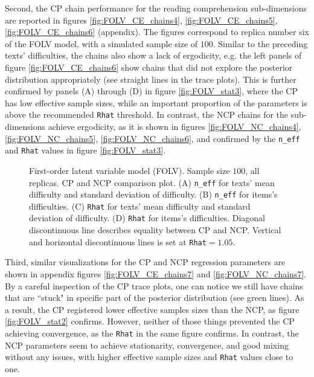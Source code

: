 Second, the CP chain performance for the reading comprehension sub-dimensions are reported in figures \ref{fig:FOLV_CE_chains4}, \ref{fig:FOLV_CE_chains5}, \ref{fig:FOLV_CE_chains6} (appendix). The figures correspond to replica number six of the FOLV model, with a simulated sample size of $100$. Similar to the preceding texts' difficulties, the chains also show a lack of ergodicity, e.g. the left panels of figure \ref{fig:FOLV_CE_chains6} show chains that did not explore the posterior distribution appropriately (see straight lines in the trace plots). This is further confirmed by panels (A) through (D) in figure \ref{fig:FOLV_stat3}, where the CP has low effective sample sizes, while an important proportion of the parameters is above the recommended \texttt{Rhat} threshold. In contrast, the NCP chains for the sub-dimensions achieve ergodicity, as it is shown in figures \ref{fig:FOLV_NC_chains4}, \ref{fig:FOLV_NC_chains5}, \ref{fig:FOLV_NC_chains6}, and confirmed by the \texttt{n\_eff} and \texttt{Rhat} values in figure \ref{fig:FOLV_stat3}.
%
\begin{figure}[H]
	\centering
	\begin{subfigure}
		\texttt{[image: FOLV\_100\_neff1]}
	\end{subfigure}
	\begin{subfigure}
		\texttt{[image: FOLV\_100\_Rhat1]}
	\end{subfigure}
	\caption[First-order latent variable model (FOLV). Sample size $100$, all replicas. CP and NCP comparison plot.]%
	{First-order latent variable model (FOLV). Sample size $100$, all replicas. CP and NCP comparison plot. (A) \texttt{n\_eff} for texts' mean difficulty and standard deviation of difficulty. (B) \texttt{n\_eff} for items's difficulties. (C) \texttt{Rhat} for texts' mean difficulty and standard deviation of difficulty. (D) \texttt{Rhat} for items's difficulties. Diagonal discontinuous line describes equality between CP and NCP. Vertical and horizontal discontinuous lines is set at \texttt{Rhat}$=1.05$. }
	\label{fig:FOLV_stat1}
\end{figure}

Third, similar visualizations for the CP and NCP regression parameters are shown in appendix figures \ref{fig:FOLV_CE_chains7} and \ref{fig:FOLV_NC_chains7}. By a careful inspection of the CP trace plots, one can notice we still have chains that are ``stuck" in specific part of the posterior distribution (see green lines). As a result, the CP registered lower effective samples sizes than the NCP, as figure \ref{fig:FOLV_stat2} confirms. However, neither of those things prevented the CP achieving convergence, as the \texttt{Rhat} in the same figure confirms. In contrast, the NCP parameters seem to achieve stationarity, convergence, and good mixing without any issues, with higher effective sample sizes and \texttt{Rhat} values close to one.

